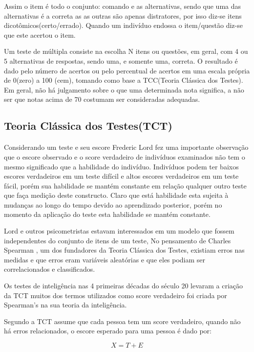 	\par
	    Assim o item é todo o conjunto: comando e as alternativas, sendo que uma das alternativas é a correta as as outras são apenas distratores, por isso diz-se itens dicotômicos(certo/errado). Quando um indivíduo endossa o item/questão diz-se que este acertou o item.
	 \par
		Um teste de múltipla consiste na escolha N itens ou questões, em geral, com 4 ou 5 alternativas de respostas, sendo uma, e somente uma, correta. O resultado é dado pelo número de acertos ou pelo percentual de acertos em uma escala própria de 0(zero) a 100 (cem), tomando como base a TCC(Teoria Clássica dos Testes). Em geral, não há julgamento sobre o que uma determinada nota significa, a não ser que notas acima de 70 costumam ser consideradas adequadas.\cite{Klein}
	
	\subsection{Teoria Clássica dos Testes(TCT)}
	\paragraph{}
	    Considerando um teste e seu escore Frederic Lord fez uma importante observação que o escore observado e o score verdadeiro de indivíduos examinados não tem o mesmo significado que a habilidade do indivíduo. Indivíduos podem ter baixos escores verdadeiros em um teste difícil e altos escores verdadeiros em um teste fácil, porém sua habilidade se mantém constante em relação qualquer outro teste que faça medição deste constructo. Claro que está habilidade esta sujeita à mudanças ao longo do tempo devido ao aprendizado posterior, porém no momento da aplicação do teste esta habilidade se mantém constante.
	\par
	    Lord e outros psicometristas estavam interessados em um modelo que fossem independentes do conjunto de itens de um teste, No pensamento de Charles Spearman \cite{Spearman}, um dos fundadores da Teoria Clássica dos Testes, existiam erros nas medidas e que  erros eram variáveis aleatórias e que eles podiam ser correlacionados e classificados.
	\par
		Os testes de inteligência nas 4 primeiras décadas do século 20 levaram a criação da TCT\cite{Klein} muitos dos termos utilizados como score verdadeiro foi criada por Spearman's na sua teoria da inteligência.
	\par
	    Segundo \textcite{Hamblenton} a TCT assume que cada pessoa tem um score verdadeiro, quando não há erros relacionados, o escore esperado para uma pessoa é dado por:
	 \par
	    \begin{equation}
	       X = T + E
	    \end{equation}
